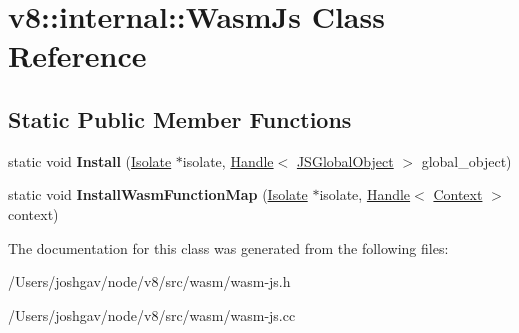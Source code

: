 \hypertarget{classv8_1_1internal_1_1_wasm_js}{}\section{v8\+:\+:internal\+:\+:Wasm\+Js Class Reference}
\label{classv8_1_1internal_1_1_wasm_js}
\subsection*{Static Public Member Functions}
\begin{DoxyCompactItemize}
\item 
static void {\bfseries Install} (\hyperlink{classv8_1_1internal_1_1_isolate}{Isolate} $\ast$isolate, \hyperlink{classv8_1_1internal_1_1_handle}{Handle}$<$ \hyperlink{classv8_1_1internal_1_1_j_s_global_object}{J\+S\+Global\+Object} $>$ global\+\_\+object)\hypertarget{classv8_1_1internal_1_1_wasm_js_a59c92ace5450fc19a4fea432c46d0e83}{}\label{classv8_1_1internal_1_1_wasm_js_a59c92ace5450fc19a4fea432c46d0e83}

\item 
static void {\bfseries Install\+Wasm\+Function\+Map} (\hyperlink{classv8_1_1internal_1_1_isolate}{Isolate} $\ast$isolate, \hyperlink{classv8_1_1internal_1_1_handle}{Handle}$<$ \hyperlink{classv8_1_1internal_1_1_context}{Context} $>$ context)\hypertarget{classv8_1_1internal_1_1_wasm_js_a45b17480d928b6835b371b4aa1187f0b}{}\label{classv8_1_1internal_1_1_wasm_js_a45b17480d928b6835b371b4aa1187f0b}

\end{DoxyCompactItemize}


The documentation for this class was generated from the following files\+:\begin{DoxyCompactItemize}
\item 
/\+Users/joshgav/node/v8/src/wasm/wasm-\/js.\+h\item 
/\+Users/joshgav/node/v8/src/wasm/wasm-\/js.\+cc\end{DoxyCompactItemize}
